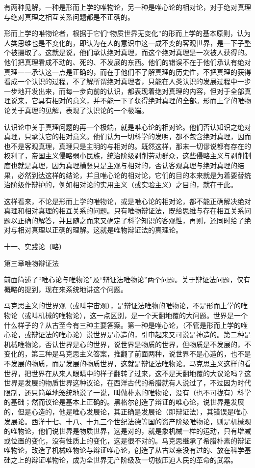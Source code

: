 有两种见解，一种是形而上学的唯物论，另一种是唯心论的相对论，对于绝对真理与绝对真理之相互关系问题都是不正确的。

形而上学的唯物论者，根据于它们“物质世界无变化”的形而上学的基本原则，认为人类思维也是不变化的，即认为在人的意识中这一成不变的客观世界，是一下子整个被摄取了。这就是说，他们承认绝对真理，而这个绝对真理是一次被人获得的。他们把真理看成不动的、死的、不发展的东西。他们的错误不在于他们承认有绝对真理一一承认这一点是正确的，而在于他们不了解真理的历史性，不把真理的获得看成一个认识的过程，不了解所谓绝对真理者，只能在人类认识的发展过程中一步一步地开发出来，而每一步向前的认识，都表现着绝对真理的内容，但对于全部真理说来，它具有相对的意义，并不能一下子获得绝对真理的全部。形而上学的唯物论关于真理的见解，表现了认识论的一个极端。

认识论中关于真理问题的再一个极端，就是唯心论的相对论。他们否认知识之绝对真理，只承认它的相对意义。他们认为一切科学的发明，都不包含绝对真理，因而也不是客观真理，真理只是主明的与相对的。既然这样，那末一切谬说都有存在的权利了，帝国主义侵略弱小民族，统治阶级剥削劳动群众，这些侵略主义与剥削制度也就是真理，因为真理横竖只是主观与相对的，否认客观真理与绝对真理的结果，必然到达这样的结论，并且唯心论的相对论，它们的目的本来就是为着要替统治阶级作辩护的，例如相对论的实用主义（或实验主义）之目的，就在于此。

这样看来，不论是形而上学的唯物论，或是唯心论的相对论，都不能正确解决绝对真理和相对真理的相互关系的问题。只有唯物辩证法，既给思维与存在相互关系问题以正确的解答，并且随之而来又确定了科学知识的客观性，再则，还同时给了绝对与相对真理以正确的理解。这就是唯物辩证法的真理论。

十一、实践论（略）

第三章唯物辩证法

前面简述了“唯心论与唯物论”及“辩证法唯物论”两个问题。关于辩证法问题，仅有概略的提到，现在来系统地讲这个问题。

马克思主义的世界观（或叫宇宙观），是辩证法唯物的唯物论，不是形而上学的唯物论（或叫机械的唯物论），这一点区别，是一个天翻地覆的大问题。世界是一个什么样子的？从古至今有三种主要答案。第一种是唯心论，（不管是形而上学的唯心论，或辩证法的唯心论）说世界是心造的，引申起来又可说是神造的。第二种是机械唯物论，否认世界是心的世界，说世界是物质的世界，但物质是不发展的，不变化的，第三种是马克思主义答案，推翻了前面两种，说世界不是心造的，也不是不发展的物质，而是发展的物质世界，这就是辩证法唯物论。马克思主义这样的看世界，把世界在从来人眼睛中的样子翻转了过来，这不是天翻地覆的大议论吗？这世界是发展的物质世界这种议论，在西洋古代的希腊就有人说过了，不过因为时代限制，还只简单地笼统地说了一说，叫做朴素的唯物论，没有（也不可拢有）科学的基础；然而议论是基本上正确的。黑格尔创造了辩证的唯心论，说世界是发展的，但是心造的，他是唯心发展论，其正确是发展论（即辩证法），其错误是唯心发展论。西洋十七、十八、十九三个世纪法德等国的资产阶级唯物论，则是机械观的唯物论，他们说世界是物质世界，这是对的，就是象机械一样的运动，只有增减或位置的变化，没有性质上的变化，这是很不对的。马克思继承了希腊朴素的辩证唯物论，改造了机械唯物论与辩证唯心论，创造了从古以来没有过的、放在科学基础之上的辩证唯物论，成为全世界无产阶级及一切被压迫人民的革命的武器。

